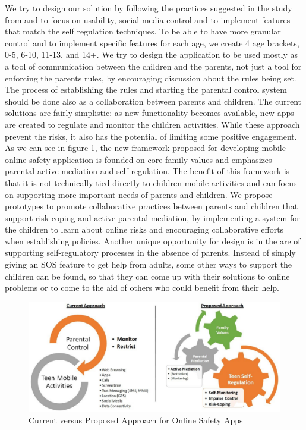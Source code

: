 We try to design our solution by following the practices suggested in the study from \citep{wisniewski2017parental} and to focus on usability, social media control and to implement features that match the self regulation techniques. To be able to have more granular control and to implement specific features for each age, we create 4 age brackets, 0-5, 6-10, 11-13, and 14+. We try to design the application to be used mostly as a tool of communication between the children and the parents, not just a tool for enforcing the parents rules, by encouraging discussion about the rules being set. The process of establishing the rules and starting the parental control system should be done also as a collaboration between parents and children. The current solutions are fairly simplistic: as new functionality becomes available, new apps are created to regulate and monitor the children activities. While these approach prevent the risks, it also has the potential of limiting some positive engagement. As we can see in figure \ref{fig:current-vs-proposed}, the new framework proposed for developing mobile online safety application is founded on core family values and emphasizes parental active mediation and self-regulation. The benefit of this framework is that it is not technically tied directly to children mobile activities and can focus on supporting more important needs of parents and children. We propose prototypes to promote collaborative practices between parents and children that support risk-coping and active parental mediation, by implementing a system for the children to learn about online risks and encouraging collaborative efforts when establishing policies. Another unique opportunity for design is in the are of supporting self-regulatory processes in the absence of parents. Instead of simply giving an SOS feature to get help from adults, some other ways to support the children can be found, so that they can come up with their solutions to online problems or to come to the aid of others who could benefit from their help.

\begin{figure}[th]
\centering
\includegraphics[width=1\textwidth]{Figures/current-vs-proposed}
\decoRule
\caption{Current versus Proposed Approach for Online Safety Apps}
\label{fig:current-vs-proposed}
\end{figure}

